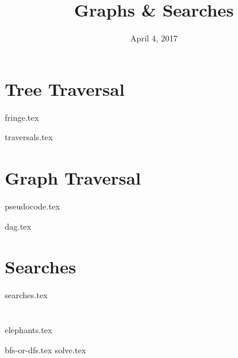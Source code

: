 \documentclass[11pt]{exam}
\title{Graphs \& Searches}
\date{April 4, 2017}
\begin{document}
\maketitle

\section{Tree Traversal}
{fringe.tex}
\begin{questions}
{traversals.tex}
\end{questions}

\section{Graph Traversal}
{pseudocode.tex}
\begin{questions}
{dag.tex}
\end{questions}

\clearpage

\section{Searches}
\begin{questions}
{searches.tex}
\end{questions}

\section{}
{elephants.tex}
\begin{questions}
{bfs-or-dfs.tex}
{solve.tex}
\end{questions}
\end{document}
